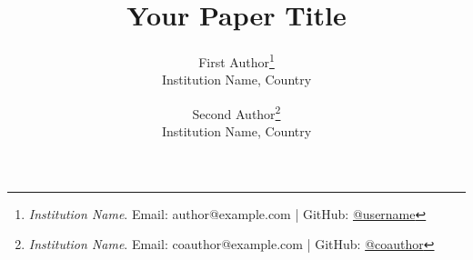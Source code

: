 \documentclass[11pt]{article}
\newcommand{\institution}[1]{\textit{#1}}
\newcommand{\papertitle}{Your Paper Title}
\begin{document}
\title{\papertitle}


\author{
    First Author\thanks{\institution{Institution Name}.
    Email: author@example.com | GitHub: \href{https://github.com/username}{@username}} \\
    \small{Institution Name, Country}
    \and
    Second Author\thanks{\institution{Institution Name}.
    Email: coauthor@example.com | GitHub: \href{https://github.com/coauthor}{@coauthor}} \\
    \small{Institution Name, Country}
}

\date{}
\maketitle
\vspace{-0.5cm}








\newpage




\newpage
\appendix







\clearpage

\clearpage


\end{document}
